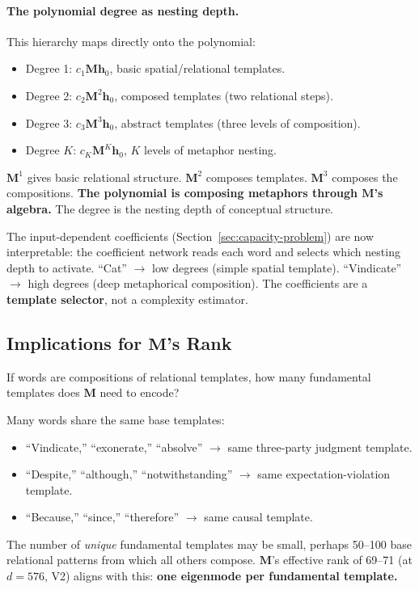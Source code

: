 \documentclass[11pt, a4paper]{article}
\newcommand{\M}{\mathbf{M}}
\newcommand{\h}{\mathbf{h}}
\theoremstyle{plain}
\theoremstyle{definition}
\theoremstyle{remark}
\begin{document}
\paragraph{The polynomial degree as nesting depth.}
This hierarchy maps directly onto the polynomial:
\begin{itemize}[nosep]
\item Degree 1: $c_1 \M \h_0$, basic spatial/relational templates.
\item Degree 2: $c_2 \M^2 \h_0$, composed templates (two relational steps).
\item Degree 3: $c_3 \M^3 \h_0$, abstract templates (three levels of composition).
\item Degree $K$: $c_K \M^K \h_0$, $K$ levels of metaphor nesting.
\end{itemize}

$\M^1$ gives basic relational structure.
$\M^2$ composes templates.
$\M^3$ composes the compositions.
\textbf{The polynomial is composing metaphors through $\M$'s algebra.}
The degree is the nesting depth of conceptual structure.

The input-dependent coefficients (Section~\ref{sec:capacity-problem}) are now interpretable: the coefficient network reads each word and selects which nesting depth to activate.
``Cat'' $\to$ low degrees (simple spatial template).
``Vindicate'' $\to$ high degrees (deep metaphorical composition).
The coefficients are a \textbf{template selector}, not a complexity estimator.

\subsection{Implications for $\M$'s Rank}

If words are compositions of relational templates, how many fundamental templates does $\M$ need to encode?

Many words share the same base templates:
\begin{itemize}[nosep]
\item ``Vindicate,'' ``exonerate,'' ``absolve'' $\to$ same three-party judgment template.
\item ``Despite,'' ``although,'' ``notwithstanding'' $\to$ same expectation-violation template.
\item ``Because,'' ``since,'' ``therefore'' $\to$ same causal template.
\end{itemize}

The number of \emph{unique} fundamental templates may be small, perhaps 50--100 base relational patterns from which all others compose.
$\M$'s effective rank of 69--71 (at $d = 576$, V2) aligns with this: \textbf{one eigenmode per fundamental template.}
\end{document}

